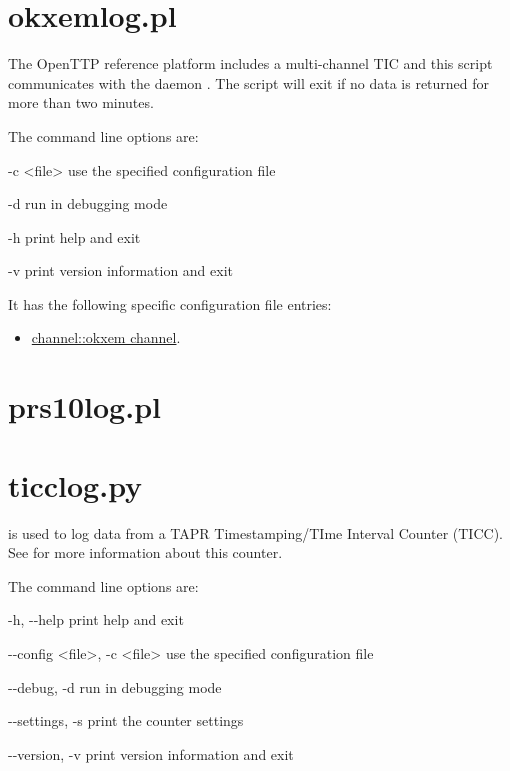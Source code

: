 \section{okxemlog.pl}
\hypertarget{h:okxemlog}{}
The OpenTTP reference platform includes a multi-channel TIC and this script communicates with the daemon
. The script will exit if no data is returned for more than two minutes.

The command line options are:
\begin{description*}
	\item[-c \textless file\textgreater] use the specified configuration file
	\item[-d]	run in debugging mode
	\item[-h]	print help and exit
	\item[-v]	print version information and exit
\end{description*}

It has the following specific configuration file entries:
\begin{itemize}
	\item \hyperlink{h:okxem_channel}{channel::okxem channel}.
\end{itemize}

\section{prs10log.pl}
\hypertarget{h:prs10log}{}

\section{ticclog.py}
\hypertarget{h:ticclog}{}

 is used to log data from a TAPR Timestamping/TIme Interval Counter (TICC).
See  for more information about this counter.

The command line options are:
\begin{description*}
 \item[-h, -{}-help] print help and exit
 \item[-{}-config \textless file\textgreater, -c \textless file\textgreater] use the specified configuration file
 \item[-{}-debug, -d]           run in debugging mode
 \item[-{}-settings, -s]        print the counter settings
  \item[-{}-version, -v]        print version information and exit
\end{description*}


